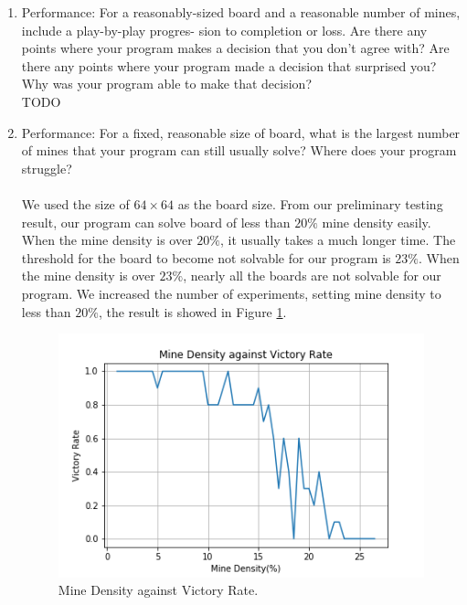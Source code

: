 \documentclass[letter]{article}
\begin{document}
\begin{enumerate}
	\item {Performance: For a reasonably-sized board and a reasonable number of mines, include a play-by-play progres- sion to completion or loss. Are there any points where your program makes a decision that you don’t agree with? Are there any points where your program made a decision that surprised you? Why was your program able to make that decision?} \\
	
	TODO \\
	
	\item {Performance: For a fixed, reasonable size of board, what is the largest number of mines that your program can still usually solve? Where does your program struggle?} \\
	\\
	We used the size of $ 64 \times 64 $ as the board size. From our preliminary testing result, our program can solve board of less than $ 20\% $ mine density easily. When the mine density is over $ 20\% $, it usually takes a much longer time. The threshold for the board to become not solvable for our program is $ 23\% $. When the mine density is over $ 23\% $, nearly all the boards are not solvable for our program. We increased the number of experiments, setting mine density to less than $ 20\% $, the result is showed in Figure \ref{fig:2}.
	
	\begin{figure}
		\centering
		\includegraphics[width=\textwidth]{../pics/Mine-Density-against-Victory-Rate.png}
		\caption{\label{fig:2}Mine Density against Victory Rate.}
	\end{figure}
	

\end{enumerate}
\end{document}
